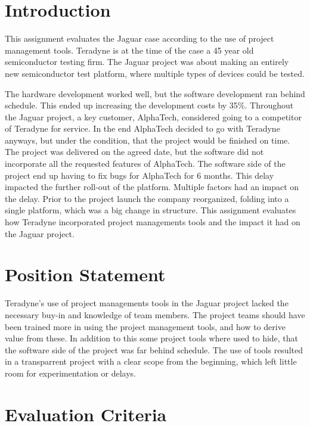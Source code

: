 \section{Introduction}
This assignment evaluates the Jaguar case according to the use of project management tools. Teradyne is at the time of the case a 45 year old semiconductor testing firm. The Jaguar project was about making an entirely new semiconductor test platform, where multiple types of devices could be tested.

The hardware development worked well, but the software development ran behind schedule. This ended up increasing the development costs by 35\%. Throughout the Jaguar project, a key customer, AlphaTech, considered going to a competitor of Teradyne for service. In the end AlphaTech decided to go with Teradyne anyways, but under the condition, that the project would be finished on time. The project was delivered on the agreed date, but the software did not incorporate all the requested features of AlphaTech. The software side of the project end up having to fix bugs for AlphaTech for 6 months. This delay impacted the further roll-out of the platform. Multiple factors had an impact on the delay. Prior to the project launch the company reorganized, folding into a single platform, which was a big change in structure. This assignment evaluates how Teradyne incorporated project managements tools and the impact it had on the Jaguar project.


\section{Position Statement}



Teradyne's use of project managements tools in the Jaguar project lacked the necessary buy-in and knowledge of team members. The project teams should have been trained more in using the project management tools, and how to derive value from these. In addition to this some project tools where used to hide, that the software side of the project was far behind schedule. The use of tools resulted in a transparrent project with a clear scope from the beginning, which left little room for experimentation or delays.

\section{Evaluation Criteria}

